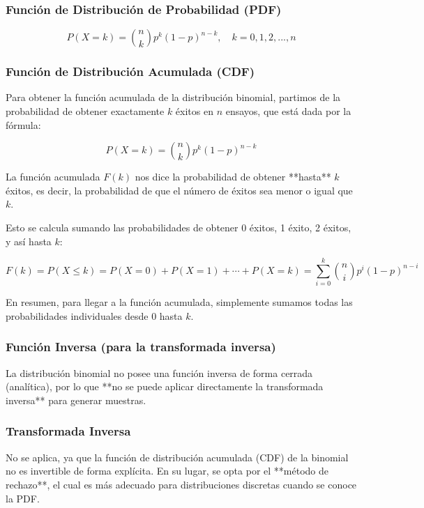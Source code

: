 \documentclass{article}
\begin{document}
\subsubsection*{Función de Distribución de Probabilidad (PDF)}
\[
P(X = k) = \binom{n}{k} p^k (1-p)^{n-k}, \quad k = 0, 1, 2, ..., n
\]

\subsubsection*{Función de Distribución Acumulada (CDF)}

Para obtener la función acumulada de la distribución binomial, partimos de la probabilidad de obtener exactamente \(k\) éxitos en \(n\) ensayos, que está dada por la fórmula:

\[
P(X = k) = \binom{n}{k} p^k (1-p)^{n-k}
\]

La función acumulada \(F(k)\) nos dice la probabilidad de obtener **hasta** \(k\) éxitos, es decir, la probabilidad de que el número de éxitos sea menor o igual que \(k\).

Esto se calcula sumando las probabilidades de obtener 0 éxitos, 1 éxito, 2 éxitos, y así hasta \(k\):

\[
F(k) = P(X \leq k) = P(X=0) + P(X=1) + \cdots + P(X=k) = \sum_{i=0}^k \binom{n}{i} p^i (1-p)^{n-i}
\]

En resumen, para llegar a la función acumulada, simplemente sumamos todas las probabilidades individuales desde 0 hasta \(k\).


\subsubsection*{Función Inversa (para la transformada inversa)}
La distribución binomial no posee una función inversa de forma cerrada (analítica), por lo que **no se puede aplicar directamente la transformada inversa** para generar muestras.

\vspace{0.5em}
\subsubsection{Transformada Inversa}
No se aplica, ya que la función de distribución acumulada (CDF) de la binomial no es invertible de forma explícita. En su lugar, se opta por el **método de rechazo**, el cual es más adecuado para distribuciones discretas cuando se conoce la PDF.

\vspace{0.5em}
\end{document}
